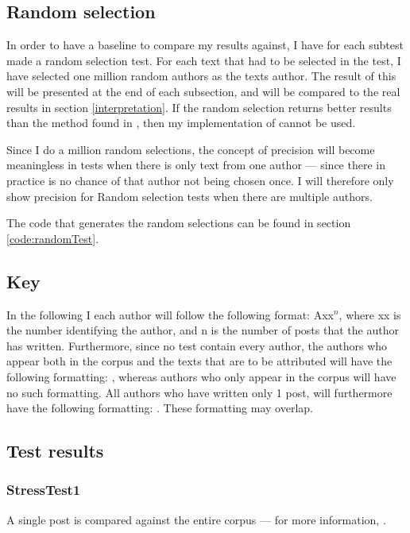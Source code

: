 \subsection{Random selection}
In order to have a baseline to compare my results against, I have for each subtest made a random selection test. For each text that had to be selected in the test, I have selected one million random authors as the texts author. The result of this will be presented at the end of each subsection, and will be compared to the real results in section \ref{interpretation}. If the random selection returns better results than the method found in \cite{nr4}, then my implementation of \cite{nr4} cannot be used. 

Since I do a million random selections, the concept of precision will become meaningless in tests when there is only text from one author --- since there in practice is no chance of that author not being chosen once. I will therefore only show precision for Random selection tests when there are multiple authors. 

The code that generates the random selections can be found in section \ref{code:randomTest}.

\subsection*{Key}
In the following I each author will follow the following format: Axx$^{n}$, where xx is the number identifying the author, and n is the number of posts that the author has written. Furthermore, since no test contain every author, the authors who appear both in the corpus and the texts that are to be attributed will have the following formatting: , whereas authors who only appear in the corpus will have no such formatting. All authors who have written only 1 post, will furthermore have the following formatting: . These formatting may overlap.\\

\subsection{Test results}

\subsubsection{StressTest1}
A single post is compared against the entire corpus --- for more information, .\nl

